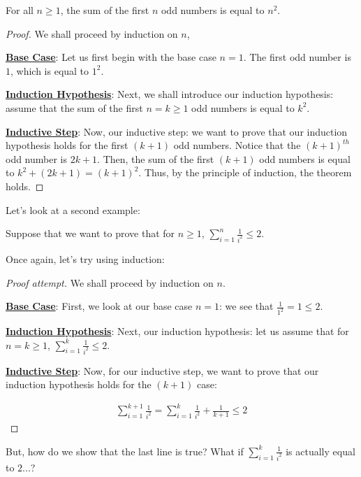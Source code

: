 \documentclass[openany]{book}
\renewcommand\qedsymbol{$\blacksquare$}
\let\oldsum\sum
\renewcommand{\sum}[2]{\oldsum\limits_{#1}^{#2}}
\begin{document}
\begin{theorem}
	For all $n\geq1$, the sum of the first $n$ odd numbers is equal to $n^2$.
\end{theorem}
\begin{proof}
	We shall proceed by induction on $n$,
	
	\textbf{\underline{Base Case}}: Let us first begin with the base case $n=1$. The first odd number is $1$, which is equal to $1^2$.
	
	\textbf{\underline{Induction Hypothesis}}: Next, we shall introduce our induction hypothesis: assume that the sum of the first $n=k\geq1$ odd numbers is equal to $k^2$.
	
	\textbf{\underline{Inductive Step}}: Now, our inductive step: we want to prove that our induction hypothesis holds for the first $(k+1)$ odd numbers. Notice that the $(k+1)^{th}$ odd number is $2k+1$. Then, the sum of the first $(k+1)$ odd numbers is equal to $k^2+(2k+1)=(k+1)^2$. Thus, by the principle of induction, the theorem holds.
\end{proof}

Let's look at a second example:

Suppose that we want to prove that for $n\geq 1$, $\sum{i=1}{n}\frac{1}{i^2}\leq2$.

Once again, let's try using induction:

\begin{proof}[Proof attempt]\renewcommand{\qedsymbol}{$\boxtimes$}
	We shall proceed by induction on $n$.
	
	\textbf{\underline{Base Case}}: First, we look at our base case $n=1$: we see that $\frac{1}{1^2}=1\leq2$.
	
	\textbf{\underline{Induction Hypothesis}}: Next, our induction hypothesis: let us assume that for $n=k\geq1$, $\sum{i=1}{k}\frac{1}{i^2}\leq2$.
	
	\textbf{\underline{Inductive Step}}: Now, for our inductive step, we want to prove that our induction hypothesis holds for the $(k+1)$ case:
	
	\begin{align*}
		\sum{i=1}{k+1}\frac{1}{i^2}=\sum{i=1}{k}\frac{1}{i^2}+\frac{1}{k+1} \leq 2
	\end{align*}
	
\end{proof}

But, how do we show that the last line is true? What if $\sum{i=1}{k}\frac{1}{i^2}$ is actually equal to $2$...?
\end{document}

